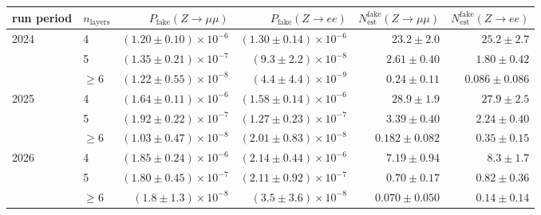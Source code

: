\begin{tabular}{llrrrr}
\toprule
run period & $n_{\mathrm{layers}}$ & $P_{\mathrm{fake}}(Z\to\mu\mu)$ & $P_{\mathrm{fake}}(Z\to ee)$ & $N^{\mathrm{fake}}_{\mathrm{est}}(Z\to\mu\mu)$ & $N^{\mathrm{fake}}_{\mathrm{est}}(Z\to ee)$ \\
\midrule
2024 & 4 & $(1.20 \pm 0.10) \times 10^{-6}$ & $(1.30 \pm 0.14) \times 10^{-6}$ & $23.2 \pm 2.0$ & $25.2 \pm 2.7$ \\
 & 5 & $(1.35 \pm 0.21) \times 10^{-7}$ & $(9.3 \pm 2.2) \times 10^{-8}$ & $2.61 \pm 0.40$ & $1.80 \pm 0.42$ \\
 & $\geq 6$ & $(1.22 \pm 0.55) \times 10^{-8}$ & $(4.4 \pm 4.4) \times 10^{-9}$ & $0.24 \pm 0.11$ & $0.086 \pm 0.086$ \\
\midrule
2025 & 4 & $(1.64 \pm 0.11) \times 10^{-6}$ & $(1.58 \pm 0.14) \times 10^{-6}$ & $28.9 \pm 1.9$ & $27.9 \pm 2.5$ \\
 & 5 & $(1.92 \pm 0.22) \times 10^{-7}$ & $(1.27 \pm 0.23) \times 10^{-7}$ & $3.39 \pm 0.40$ & $2.24 \pm 0.40$ \\
 & $\geq 6$ & $(1.03 \pm 0.47) \times 10^{-8}$ & $(2.01 \pm 0.83) \times 10^{-8}$ & $0.182 \pm 0.082$ & $0.35 \pm 0.15$ \\
\midrule
2026 & 4 & $(1.85 \pm 0.24) \times 10^{-6}$ & $(2.14 \pm 0.44) \times 10^{-6}$ & $7.19 \pm 0.94$ & $8.3 \pm 1.7$ \\
 & 5 & $(1.80 \pm 0.45) \times 10^{-7}$ & $(2.11 \pm 0.92) \times 10^{-7}$ & $0.70 \pm 0.17$ & $0.82 \pm 0.36$ \\
 & $\geq 6$ & $(1.8 \pm 1.3) \times 10^{-8}$ & $(3.5 \pm 3.6) \times 10^{-8}$ & $0.070 \pm 0.050$ & $0.14 \pm 0.14$ \\
\bottomrule
\end{tabular}
